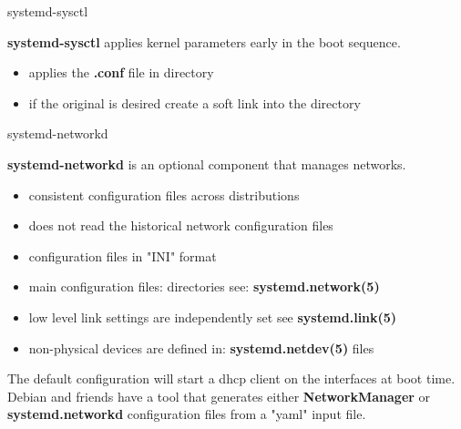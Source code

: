 \cprotect\note{
	}


\begin{frame}
	{systemd-sysctl} 

	\textbf{systemd-sysctl} applies kernel parameters 
	early in the boot sequence.  
	\begin{itemize} 
		\item applies the \textbf{.conf} file in  directory
		\item if the original  is desired 
			create a soft link into the  directory
		\end{itemize}

\end{frame}

\cprotect\note{

	}

\begin{frame} 
	{systemd-networkd}

	\textbf{systemd-networkd} is an optional component that manages networks.
	\begin{itemize}
		\item consistent configuration files across distributions
		\item does not read the historical network configuration files
		\item configuration files in "INI" format 
		\item main configuration files: 
		 directories see: 
			\textbf{systemd.network(5)} 
		\item low level link settings are independently set
			see \textbf{systemd.link(5)}
		\item non-physical devices are defined in:
			\textbf{systemd.netdev(5)} files
		\end{itemize}

		The default configuration will start a dhcp client on the 
		interfaces at boot time. \\

		Debian and friends have a tool that generates
		either \textbf{NetworkManager} or \textbf{systemd.networkd}
		configuration files from a "yaml" input file.


\end{frame} 

\cprotect\note{

	}

